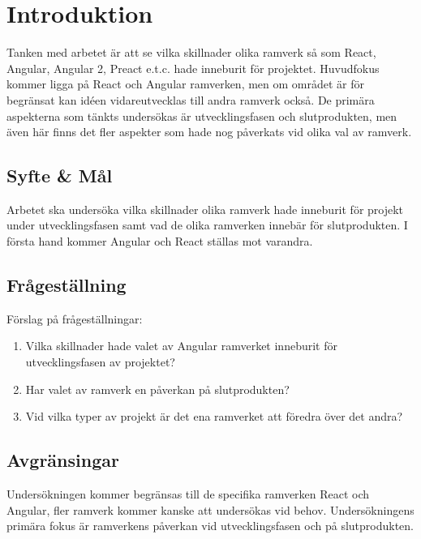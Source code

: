 \section{Introduktion}
\label{sec:axel-introduction}
Tanken med arbetet är att se vilka skillnader olika ramverk så som React, Angular, Angular 2, Preact e.t.c. hade inneburit för projektet. Huvudfokus kommer ligga på React och Angular ramverken, men om området är för begränsat kan idéen vidareutvecklas till andra ramverk också. De primära aspekterna som tänkts undersökas är utvecklingsfasen och slutprodukten, men även här finns det fler aspekter som hade nog påverkats vid olika val av ramverk.

\subsection{Syfte \& Mål}
\label{subsec:motivation}

Arbetet ska undersöka vilka skillnader olika ramverk hade inneburit för projekt under utvecklingsfasen samt vad de olika ramverken innebär för slutprodukten. I första hand kommer Angular och React ställas mot varandra. 

\subsection{Frågeställning}
\label{subsec:research-questions}

Förslag på frågeställningar:

\begin{enumerate}
\item Vilka skillnader hade valet av Angular ramverket inneburit för utvecklingsfasen av projektet?

\item Har valet av ramverk en påverkan på slutprodukten?

\item Vid vilka typer av projekt är det ena ramverket att föredra över det andra?


\end{enumerate}


\subsection{Avgränsingar}
\label{subsec:delimitations}

Undersökningen kommer begränsas till de specifika ramverken React och Angular, fler ramverk kommer kanske att undersökas vid behov. Undersökningens primära fokus är ramverkens påverkan vid utvecklingsfasen och på slutprodukten.




